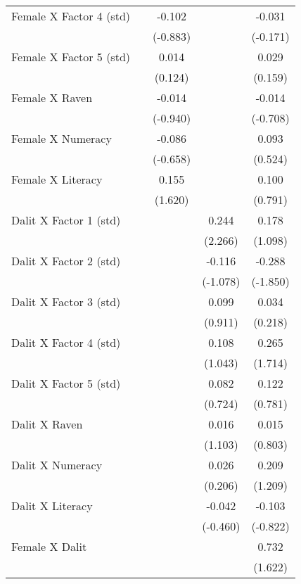 \begin{longtable}{lcccc}
    Female X Factor 4 (std) &       & -0.102 &       & -0.031 \\
          &       & (-0.883) &       & (-0.171) \\
    Female X Factor 5 (std) &       & 0.014 &       & 0.029 \\
          &       & (0.124) &       & (0.159) \\
    Female X Raven &       & -0.014 &       & -0.014 \\
          &       & (-0.940) &       & (-0.708) \\
    Female X Numeracy &       & -0.086 &       & 0.093 \\
          &       & (-0.658) &       & (0.524) \\
    Female X Literacy &       & 0.155 &       & 0.100 \\
          &       & (1.620) &       & (0.791) \\
    Dalit X Factor 1 (std) &       &       & 0.244 & 0.178 \\
          &       &       & (2.266) & (1.098) \\
    Dalit X Factor 2 (std) &       &       & -0.116 & -0.288 \\
          &       &       & (-1.078) & (-1.850) \\
    Dalit X Factor 3 (std) &       &       & 0.099 & 0.034 \\
          &       &       & (0.911) & (0.218) \\
    Dalit X Factor 4 (std) &       &       & 0.108 & 0.265 \\
          &       &       & (1.043) & (1.714) \\
    Dalit X Factor 5 (std) &       &       & 0.082 & 0.122 \\
          &       &       & (0.724) & (0.781) \\
    Dalit X Raven &       &       & 0.016 & 0.015 \\
          &       &       & (1.103) & (0.803) \\
    Dalit X Numeracy &       &       & 0.026 & 0.209 \\
          &       &       & (0.206) & (1.209) \\
    Dalit X Literacy &       &       & -0.042 & -0.103 \\
          &       &       & (-0.460) & (-0.822) \\
    Female X Dalit &       &       &       & 0.732 \\
          &       &       &       & (1.622) \\

\end{longtable}
